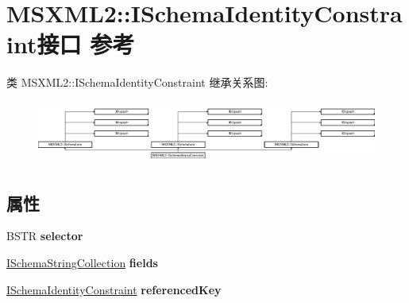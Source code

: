 \hypertarget{interface_m_s_x_m_l2_1_1_i_schema_identity_constraint}{}\section{M\+S\+X\+M\+L2\+:\+:I\+Schema\+Identity\+Constraint接口 参考}
\label{interface_m_s_x_m_l2_1_1_i_schema_identity_constraint}
类 M\+S\+X\+M\+L2\+:\+:I\+Schema\+Identity\+Constraint 继承关系图\+:\begin{figure}[H]
\begin{center}
\leavevmode
\includegraphics[height=2.083333cm]{interface_m_s_x_m_l2_1_1_i_schema_identity_constraint}
\end{center}
\end{figure}
\subsection*{属性}
\begin{DoxyCompactItemize}
\item 
\mbox{\label{interface_m_s_x_m_l2_1_1_i_schema_identity_constraint_ad542f72dc249477b2401164ddd636eb6}} 
B\+S\+TR {\bfseries selector}
\item 
\mbox{\label{interface_m_s_x_m_l2_1_1_i_schema_identity_constraint_ae143c81e1d1f944741ebd74d1ab32a2a}} 
\hyperlink{interface_m_s_x_m_l2_1_1_i_schema_string_collection}{I\+Schema\+String\+Collection} {\bfseries fields}
\item 
\mbox{\label{interface_m_s_x_m_l2_1_1_i_schema_identity_constraint_a15688cc835e566613745acfac773fb39}} 
\hyperlink{interface_m_s_x_m_l2_1_1_i_schema_identity_constraint}{I\+Schema\+Identity\+Constraint} {\bfseries referenced\+Key}
\end{DoxyCompactItemize}
